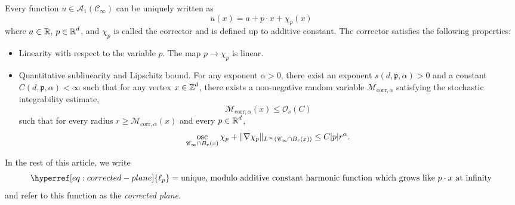 \documentclass[12pt]{amsart}
\numberwithin{equation}{section}
\begin{document}
	\begin{theorem} \label{theorem:first-order-corrector}
		Every function $u \in \mathcal{A}_1(\mathscr{C}_{\infty})$ can be uniquely written as 
		\[
		u(x) = a + p \cdot x + \chi_p(x)
		\]
		where $a \in \operatorname{\mathbb{R}}$, $p \in \operatorname{\mathbb{R}}^d$, and $\chi_p$ is called the corrector and is defined up to additive constant. 
		The corrector satisfies the following properties:
		\begin{itemize}
			\item Linearity with respect to the variable $p$. The map $p \to \chi_p$ is linear.
			\item Quantitative sublinearity and Lipschitz bound. For any exponent $\alpha > 0$, there exist an exponent $s(d, \mathfrak{p}, \alpha) > 0$ and a constant $C(d, \mathfrak{p}, \alpha) < \infty$
			such that for any vertex $x \in \operatorname{\mathbb{Z}}^d$, there exists a non-negative random variable $ \mathcal{M}_{\mathrm{corr}, \alpha}$
			satisfying the stochastic integrability estimate, 
			\begin{equation}
				\mathcal{M}_{\mathrm{corr}, \alpha}(x) \leq \mathcal{O}_s(C)
			\end{equation}
			such that for every radius $r \geq \mathcal{M}_{\mathrm{corr}, \alpha}(x)$ and every $p \in \operatorname{\mathbb{R}}^d$,
			\begin{equation} \label{eq:corrector-sublinearity-and-lipschitz}
				\operatorname*{osc}_{\mathscr{C}_{\infty} \cap B_r(x)} \chi_p + \| \nabla \chi_p \|_{L^{\infty}(\mathscr{C}_{\infty} \cap B_r(x))} \leq C |p| r^{\alpha}. 
			\end{equation}
		\end{itemize}
	\end{theorem}
	
	
	
	\newcommand{\ellp}[1]{\hyperref[eq:corrected-plane]{\ell_{#1}}}
	
	In the rest of this article, we write 
	\begin{equation} \label{eq:corrected-plane}
		\ellp{p} = \mbox{unique, modulo additive constant harmonic function which grows like $p \cdot x$ at infinity} \\
	\end{equation}
	and refer to this function as the {\it corrected plane}. 
	
\end{document}
